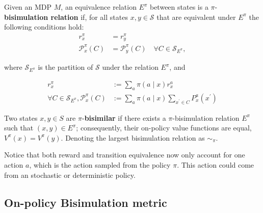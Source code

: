 \begin{definition}
\label{def:on-policy-bisimulation}
Given an MDP $M$, an equivalence relation $E^\pi$ between states is a $\pi$-\textbf{bisimulation relation} if, for all states $x, y \in \mathcal{S}$ that are equivalent under $E^\pi$ the following conditions hold:
\begin{align}
\label{eq:on_policy_reward_equivalence}
r_{x}^\pi & = r_{y}^\pi
 \\
\label{eq:on_policy_transition_equivalence}
\mathcal{P}_{x}^\pi\left(C \right) & =\mathcal{P}_{y}^\pi\left(C\right) \quad \forall C \in \mathcal{S}_{E^\pi},
\end{align}

where $\mathcal{S}_{E^\pi}$ is the partition of $\mathcal{S}$ under the relation $E^\pi$, and

\begin{equation}
\begin{aligned}
\label{eq:on_policy_reward_transition}
r_x^\pi & :=\sum_a \pi(a \mid x) r_x^a \\
\forall C \in \mathcal{S}_{E^\pi}, \mathcal{P}_x^\pi(C) & :=\sum_a \pi(a \mid x) \sum_{x^{\prime} \in C} P_x^a(x^{\prime})
\end{aligned}
\end{equation}

Two states $x, y \in S$ are $\pi$-\textbf{bisimilar} if there exists a $\pi$-bisimulation relation $E^\pi$ such that $(x, y) \in E^\pi$; consequently, their on-policy value functions are equal, \(V^\pi(x) = V^\pi(y)\). Denoting the largest bisimulation relation as $\sim_\pi$.
\end{definition}

Notice that both reward and transition equivalence now only account for one action $a$, which is the action sampled from the policy $\pi$. This action could come from an stochastic or deterministic policy. 


\subsection{On-policy Bisimulation metric}


